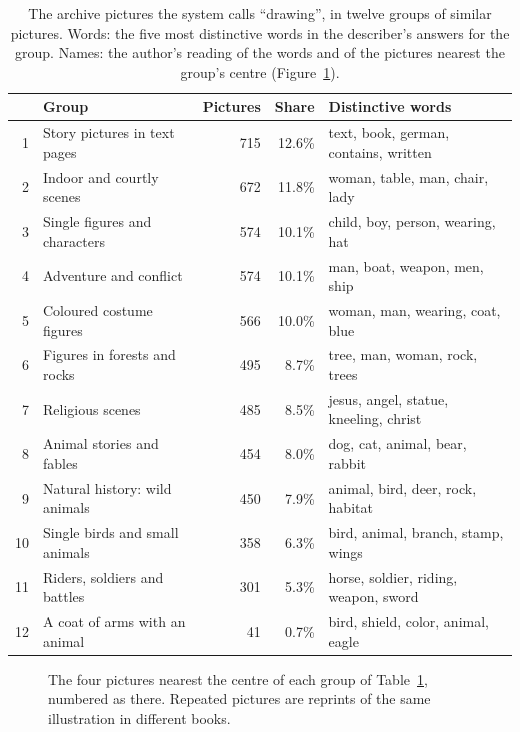 \begin{table}[!htbp]
\centering
\caption[What the class ``drawing'' contains]{The archive pictures the system calls ``drawing'', in twelve groups of similar pictures. Words: the five most distinctive words in the describer's answers for the group. Names: the author's reading of the words and of the pictures nearest the group's centre (Figure~\ref{fig:drawing_clusters}).}
\label{tab:drawing_clusters}
\small
\begin{tabular}{rlrr>{\raggedright\arraybackslash}p{5.6cm}}
\toprule
 & Group & Pictures & Share & Distinctive words \\
\midrule
1 & Story pictures in text pages & 715 & 12.6\% & text, book, german, contains, written \\
2 & Indoor and courtly scenes & 672 & 11.8\% & woman, table, man, chair, lady \\
3 & Single figures and characters & 574 & 10.1\% & child, boy, person, wearing, hat \\
4 & Adventure and conflict & 574 & 10.1\% & man, boat, weapon, men, ship \\
5 & Coloured costume figures & 566 & 10.0\% & woman, man, wearing, coat, blue \\
6 & Figures in forests and rocks & 495 & 8.7\% & tree, man, woman, rock, trees \\
7 & Religious scenes & 485 & 8.5\% & jesus, angel, statue, kneeling, christ \\
8 & Animal stories and fables & 454 & 8.0\% & dog, cat, animal, bear, rabbit \\
9 & Natural history: wild animals & 450 & 7.9\% & animal, bird, deer, rock, habitat \\
10 & Single birds and small animals & 358 & 6.3\% & bird, animal, branch, stamp, wings \\
11 & Riders, soldiers and battles & 301 & 5.3\% & horse, soldier, riding, weapon, sword \\
12 & A coat of arms with an animal & 41 & 0.7\% & bird, shield, color, animal, eagle \\
\bottomrule
\end{tabular}
\end{table}

\begin{figure}[!htbp]
\centering
{}
\caption[Example pictures of the twelve ``drawing'' groups]{The four pictures nearest the centre of each group of Table~\ref{tab:drawing_clusters}, numbered as there. Repeated pictures are reprints of the same illustration in different books.}
\label{fig:drawing_clusters}
\end{figure}

